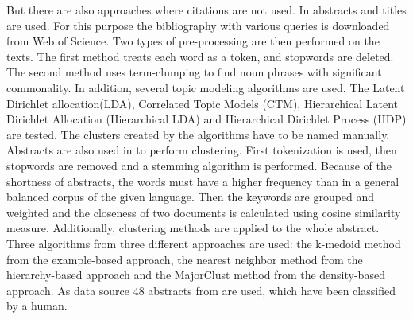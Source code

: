 But there are also approaches where citations are not used.
In \cite{Clustering_scientific_documents_with_topic_modeling} abstracts and titles are used.
For this purpose the bibliography with various queries is downloaded from Web of Science\cite{web_of_science}.  
Two types of pre-processing are then performed on the texts. The first method treats each word as a token, and stopwords are deleted. The second method uses term-clumping to find noun phrases with significant commonality.
In addition, several topic modeling algorithms are used. 
The Latent Dirichlet allocation(LDA), Correlated Topic Models (CTM), Hierarchical Latent Dirichlet Allocation (Hierarchical LDA) and Hierarchical Dirichlet Process (HDP) are tested.
The clusters created by the algorithms have to be named manually.
Abstracts are also used in \cite{An_Approach_to_Clustering_Abstracts} to perform clustering.
First tokenization is used, then stopwords are removed and a stemming algorithm is performed.
Because of the shortness of abstracts, the words must have a higher frequency than in a general balanced corpus of the given language. Then the keywords are grouped and weighted and the closeness of two documents is calculated using cosine similarity measure. 
Additionally, clustering methods are applied to the whole abstract. Three algorithms from three different approaches are used: the k-medoid method from the example-based approach, the nearest neighbor method from the hierarchy-based approach and the MajorClust method from the density-based approach.
As data source 48 abstracts from \cite{cicling} are used, which have been classified by a human.